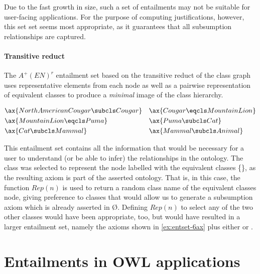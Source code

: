 Due to the fast growth in size, such a set of entailments may not be suitable for user-facing applications. For the purpose of computing justifications, however, this set set seems most appropriate, as it guarantees that all subsumption relationships are captured.

\paragraph{Transitive reduct}

The $A^{+}(EN)^{r}$ entailment set based on the transitive reduct of the class graph uses representative elements from each node as well as a pairwise representation of equivalent classes to produce a \emph{minimal} image of the class hierarchy. 

\begin{examp}
\begin{align*}
& \ax{NorthAmericanCougar \subcls Cougar}&&\ax{Cougar \eqcls MountainLion} \\
& \ax{MountainLion \eqcls Puma} && \ax{Puma \subcls Cat} \\
& \ax{Cat \subcls Mammal} &&\ax{Mammal \subcls Animal}\\
\end{align*}\label{ex:entset-6ax}
\end{examp}

This entailment set contains all the information that would be necessary for a user to understand (or be able to infer) the relationships in the ontology. The class  was selected to represent the node labelled with the equivalent classes \{\}, as the resulting axiom   is part of the asserted ontology. That is, in this case, the function $Rep(n)$ is used to return a random class name of the equivalent classes node, giving preference to classes that would allow us to generate a subsumption axiom which is already asserted in \O. Defining $Rep(n)$ to select any of the two other classes would have been appropriate, too, but would have resulted in a larger entailment set, namely the axioms shown in \ref{ex:entset-6ax} plus either  or .




\section{Entailments in OWL applications}
 
